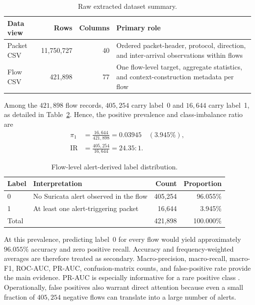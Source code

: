 \documentclass[11pt,fleqn]{report}
\begin{document}
\begin{table}[H]
    \centering
    \caption{Raw extracted dataset summary.}
    \label{tab:raw_dataset_summary}
    \begin{tabular}{@{}lrrp{5.7cm}@{}}
        \toprule
        Data view & Rows & Columns & Primary role \\
        \midrule
        Packet CSV & 11,750,727 & 40 & Ordered packet-header, protocol, direction, and inter-arrival observations within flows \\
        Flow CSV & 421,898 & 77 & One flow-level target, aggregate statistics, and context-construction metadata per flow \\
        \bottomrule
    \end{tabular}
\end{table}

Among the $421{,}898$ flow records, $405{,}254$ carry label~0 and $16{,}644$ carry label~1, as detailed in Table~\ref{tab:flow_label_distribution}. Hence, the positive prevalence and class-imbalance ratio are
\begin{align}
    \pi_1 &= \frac{16{,}644}{421{,}898} = 0.03945
             \quad (3.945\%), \\
    \mathrm{IR} &= \frac{405{,}254}{16{,}644} = 24.35:1.
    \label{eq:dataset_imbalance}
\end{align}

\begin{table}[H]
    \centering
    \caption{Flow-level alert-derived label distribution.}
    \label{tab:flow_label_distribution}
    \begin{tabular}{@{}llrr@{}}
        \toprule
        Label & Interpretation & Count & Proportion \\
        \midrule
        0 & No Suricata alert observed in the flow & 405,254 & 96.055\% \\
        1 & At least one alert-triggering packet & 16,644 & 3.945\% \\
        \midrule
        Total & & 421,898 & 100.000\% \\
        \bottomrule
    \end{tabular}
\end{table}

At this prevalence, predicting label~0 for every flow would yield approximately $96.055\%$ accuracy and zero positive recall. Accuracy and frequency-weighted averages are therefore treated as secondary. Macro-precision, macro-recall, macro-F1, ROC-AUC, PR-AUC, confusion-matrix counts, and false-positive rate provide the main evidence. PR-AUC is especially informative for a rare positive class \cite{SaitoRehmsmeier2015}. Operationally, false positives also warrant direct attention because even a small fraction of $405{,}254$ negative flows can translate into a large number of alerts.
\end{document}
